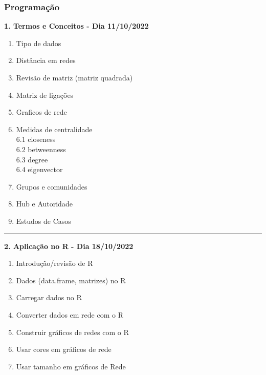 \documentclass[
]{article}
\providecommand{\tightlist}{%
  \setlength{\itemsep}{0pt}\setlength{\parskip}{0pt}}
\begin{document}
\hypertarget{programauxe7uxe3o}{%
\subsubsection{Programação}\label{programauxe7uxe3o}}

\textbf{1. Termos e Conceitos - Dia 11/10/2022}

\begin{enumerate}
\def\labelenumi{\arabic{enumi}.}
\tightlist
\item
  Tipo de dados\\
\item
  Distância em redes\\
\item
  Revisão de matriz (matriz quadrada)\\
\item
  Matriz de ligações\\
\item
  Graficos de rede\\
\item
  Medidas de centralidade\\
  6.1 closeness\\
  6.2 betweenness\\
  6.3 degree\\
  6.4 eigenvector\\
\item
  Grupos e comunidades\\
\item
  Hub e Autoridade\\
\item
  Estudos de Casos
\end{enumerate}

\begin{center}\rule{0.5\linewidth}{0.5pt}\end{center}

\textbf{2. Aplicação no R - Dia 18/10/2022}

\begin{enumerate}
\def\labelenumi{\arabic{enumi}.}
\tightlist
\item
  Introdução/revisão de R
\item
  Dados (data.frame, matrizes) no R
\item
  Carregar dados no R
\item
  Converter dados em rede com o R
\item
  Construir gráficos de redes com o R
\item
  Usar cores em gráficos de rede
\item
  Usar tamanho em gráficos de Rede
\end{enumerate}
\end{document}
